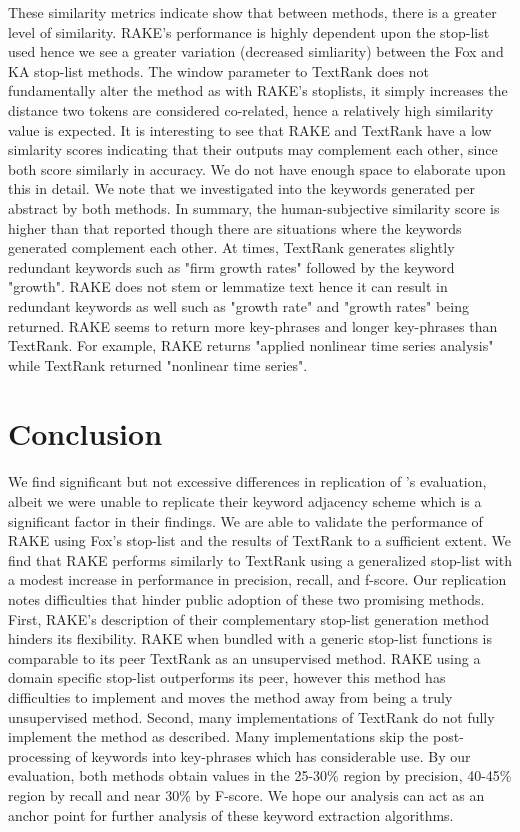 \documentclass[11pt,a4paper]{article}
\begin{document}
These similarity metrics indicate show that between methods, there is a greater level of similarity. RAKE's performance is highly dependent upon the stop-list used hence we see a greater variation (decreased simliarity) between the Fox and KA stop-list methods. The window parameter to TextRank does not fundamentally alter the method as with RAKE's stoplists, it simply increases the distance two tokens are considered co-related, hence a relatively high similarity value is expected. It is interesting to see that  RAKE and TextRank have a low simlarity scores indicating that their outputs may complement each other, since both score similarly in accuracy. We do not have enough space to elaborate upon this in detail. We note that we investigated into the keywords generated per abstract by both methods. In summary, the human-subjective similarity score is higher than that reported though there are situations where the keywords generated complement each other. At times, TextRank generates slightly redundant keywords such as "firm growth rates" followed by the keyword "growth".  RAKE does not stem or lemmatize text hence it can result in redundant keywords as well such as "growth rate" and "growth rates" being returned. RAKE seems to return more key-phrases and longer key-phrases than TextRank. For example, RAKE returns "applied nonlinear time series analysis" while TextRank returned "nonlinear time series".

\section{Conclusion}

We find significant but not excessive differences in replication of \citet{1}'s evaluation, albeit we were unable to replicate their keyword adjacency scheme which is a significant factor in their findings. We are able to validate the performance of RAKE using Fox's stop-list and the results of TextRank to a sufficient extent. We find that RAKE performs similarly to TextRank using a generalized stop-list with a modest increase in performance in precision, recall, and f-score. Our replication notes difficulties that hinder public adoption of these two promising methods. First, RAKE's description of their complementary stop-list generation method hinders its flexibility. RAKE when bundled with a generic stop-list functions is comparable to its peer TextRank as an unsupervised method. RAKE using a domain specific stop-list outperforms its peer, however this method has difficulties to implement and moves the method away from being a truly unsupervised method. Second, many implementations of TextRank do not fully implement the method as described. Many implementations skip the post-processing of keywords into key-phrases which has considerable use. By our evaluation, both methods obtain values in the 25-30\% region by precision, 40-45\% region by recall and near 30\% by F-score. We hope our analysis can act as an anchor point for further analysis of these keyword extraction algorithms. 
\end{document}
